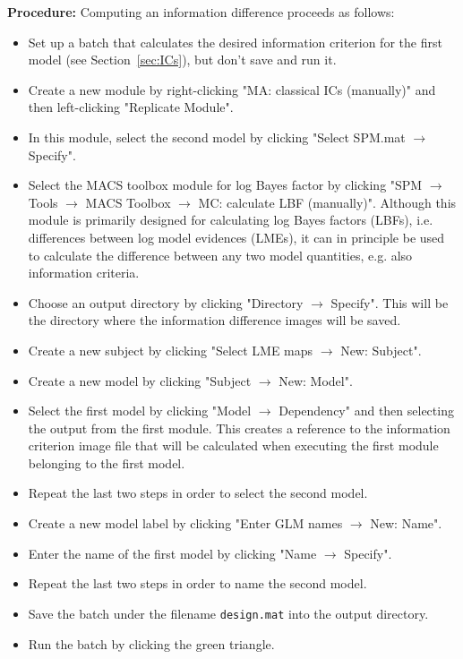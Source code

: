 \documentclass[a4paper,12pt]{article}
\newcommand{\ra}{$\rightarrow$ }
\begin{document}
\textbf{Procedure:} Computing an information difference proceeds as follows:
\begin{itemize}

\item
Set up a batch that calculates the desired information criterion for the first model (see Section~\ref{sec:ICs}), but don't save and run it.

\item
Create a new module by right-clicking "MA: classical ICs (manually)" and then left-clicking "Replicate Module".

\item
In this module, select the second model by clicking "Select SPM.mat \ra Specify".

\item
Select the MACS toolbox module for log Bayes factor by clicking "SPM \ra Tools \ra MACS Toolbox \ra MC: calculate LBF (manually)". Although this module is primarily designed for calculating log Bayes factors (LBFs), i.e. differences between log model evidences (LMEs), it can in principle be used to calculate the difference between any two model quantities, e.g. also information criteria.

\item
Choose an output directory by clicking "Directory \ra Specify". This will be the directory where the information difference images will be saved.

\item
Create a new subject by clicking "Select LME maps \ra New: Subject".

\item
Create a new model by clicking "Subject \ra New: Model".

\item
Select the first model by clicking "Model \ra Dependency" and then selecting the output from the first module. This creates a reference to the information criterion image file that will be calculated when executing the first module belonging to the first model.

\item
Repeat the last two steps in order to select the second model.

\item
Create a new model label by clicking "Enter GLM names \ra New: Name".

\item
Enter the name of the first model by clicking "Name \ra Specify".

\item
Repeat the last two steps in order to name the second model.

\pagebreak
\item
Save the batch under the filename \texttt{design.mat} into the output directory.

\item
Run the batch by clicking the green triangle.
	
\end{itemize}
\end{document}

